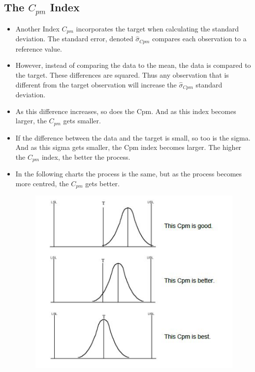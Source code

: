 \documentclass[11pt]{article} %
\begin{document}
					\subsection*{The  $C_{pm}$ Index}
\begin{itemize}
\item	Another Index $C_{pm}$ incorporates the target when calculating the standard deviation. The standard error, denoted $\hat{\sigma}_{Cpm}$ compares each observation to a reference value. \item However, instead of comparing the data to the mean, the data is compared to the target. These differences are squared. Thus any observation that is different from the target observation will increase the $\hat{\sigma}_{Cpm}$  standard deviation.
\item As this difference increases, so does the Cpm. And as this index becomes larger, the $C_{pm}$ gets smaller. 
	
\item If the difference between the data and the target is small, so too is the sigma. And as this sigma gets smaller, the Cpm index becomes larger. The higher the $C_{pm}$ index, the better the process.
	
\item In the following charts the process is the same, but as the process becomes more centred, the $C_{pm}$ gets better.
	\begin{figure}[h!]
		\centering
		\includegraphics[width=0.7\linewidth]{proccapindices/image6}
	\end{figure}
\end{itemize}
\newpage				
			
\end{document}
